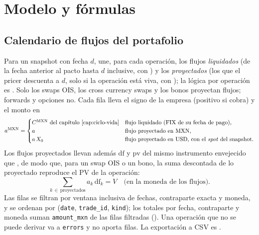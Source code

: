 \section{Modelo y fórmulas}\label{sec:cap11-modelo}

\subsection{Calendario de flujos del portafolio}\label{sec:cap11-flujos}

Para un snapshot con fecha $d$,  une, para cada operación, los flujos \emph{liquidados} (de la fecha anterior al pacto hasta $d$ inclusive, con ) y los \emph{proyectados} (los que el pricer descuenta a $d$, solo si la operación está viva, con ); la lógica por operación es . Solo los swaps OIS, los cross currency swaps y los bonos proyectan flujos; forwards y opciones no. Cada fila lleva el signo de la empresa (positivo si cobra) y el monto en \MXN
\begin{equation}\label{eq:cap11-monto-mxn}
  a^{\textup{MXN}} =
  \begin{cases}
    C^{\textup{MXN}} \text{ del capítulo~\ref{cap:ciclo-vida}} & \text{flujo liquidado (FIX de su fecha de pago),}\\
    a & \text{flujo proyectado en \textup{MXN},}\\
    a\,X_0 & \text{flujo proyectado en \textup{USD}, con el \emph{spot} del snapshot.}
  \end{cases}
\end{equation}
Los flujos proyectados llevan además $\mathrm{df}$ y $\mathrm{pv}$ del mismo instrumento envejecido que , de modo que, para un swap OIS o un bono, la suma descontada de lo proyectado reproduce el PV de la operación:
\begin{equation}\label{eq:cap11-suma-flujos}
  \sum_{k\,\in\,\text{proyectados}} a_k\,\mathrm{df}_k = V \quad\text{(en la moneda de los flujos).}
\end{equation}
Las filas se filtran por ventana inclusiva de fechas, contraparte exacta y moneda, y se ordenan por (\texttt{date}, \texttt{trade\_id}, \texttt{kind}); los totales por fecha, contraparte y moneda suman \texttt{amount\_mxn} de las filas filtradas (). Una operación que no se puede derivar va a \texttt{errors} y no aporta filas. La exportación a CSV es .

